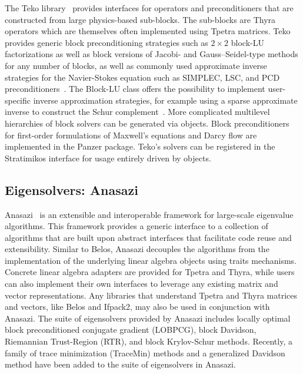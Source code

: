 The Teko library~\cite{Cyr2016a} provides interfaces for operators and preconditioners that are constructed from large physics-based sub-blocks.
The sub-blocks are Thyra operators which are themselves often implemented using Tpetra matrices.
Teko provides generic block preconditioning strategies such as $2\times2$ block-LU factorizations as well as block versions of Jacobi- and Gauss--Seidel-type methods for any number of blocks,
as well as commonly used approximate inverse strategies for the Navier-Stokes equation
such as SIMPLEC, LSC, and PCD preconditioners~\cite{CyrShadidEtAl2012_StabilizationScalableBlockPreconditioning}.
The Block-LU class offers the possibility to implement user-specific inverse approximation strategies,
for example using a sparse approximate inverse to construct the Schur complement~\cite{Firmbach2024a}.
More complicated multilevel hierarchies of block solvers can be generated via  objects.
Block preconditioners for first-order formulations of Maxwell's equations and Darcy flow are implemented in the Panzer package.
Teko's solvers can be registered in the Stratimikos interface for usage entirely driven by  objects.

\subsection{Eigensolvers: Anasazi}
Anasazi~\cite{Baker2009a} is an extensible and interoperable framework for large-scale eigenvalue algorithms.
This framework provides a generic interface to a collection of algorithms that are built upon abstract interfaces
that facilitate code reuse and extensibility.  Similar to Belos, Anasazi decouples the algorithms from the
implementation of the underlying linear algebra objects using traits mechanisms.  Concrete linear algebra adapters
are provided for Tpetra and Thyra, while users can also implement their own interfaces to leverage any existing matrix and vector representations. Any libraries that understand Tpetra and Thyra matrices
and vectors, like Belos and Ifpack2, may also be used in conjunction with Anasazi.  The suite of eigensolvers provided
by Anasazi includes locally optimal block preconditioned conjugate gradient (LOBPCG), block Davidson, Riemannian Trust-Region
(RTR), and block Krylov-Schur methods.  Recently, a family of trace minimization (TraceMin) methods and a
generalized Davidson method have been added to the suite of eigensolvers in Anasazi.


